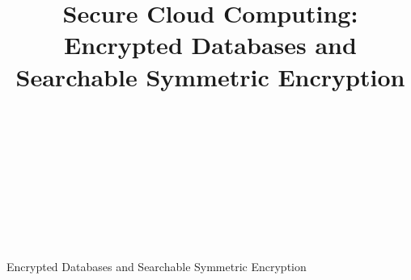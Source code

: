 \documentclass[10pt]{article}
\begin{document}
\title{Secure Cloud Computing:\\ {\large Encrypted Databases and Searchable Symmetric Encryption}%
%
}

\author{\\[2pt] 
\\
\\
\and
{}\\[2pt] 
\\
\\
}

%
%
{Encrypted Databases and Searchable Symmetric Encryption} 

\maketitle

%    



\newpage



\end{document}
